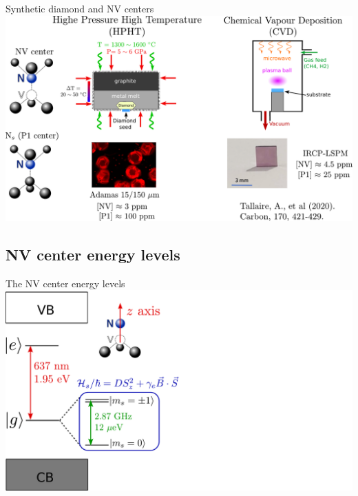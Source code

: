 \documentclass{beamer}
\begin{document}
\begin{frame}{Synthetic diamond and NV centers}
\centering
\includegraphics[width=\textwidth,height=0.85\textheight,keepaspectratio]{Slide_fab_sample}
\end{frame}

\subsection{NV center energy levels}
\begin{frame}{The NV center energy levels}
\centering
\includegraphics[width=\textwidth,height=0.85\textheight,keepaspectratio]{Slide_NV_levels_3}
\end{frame}

\end{document}
